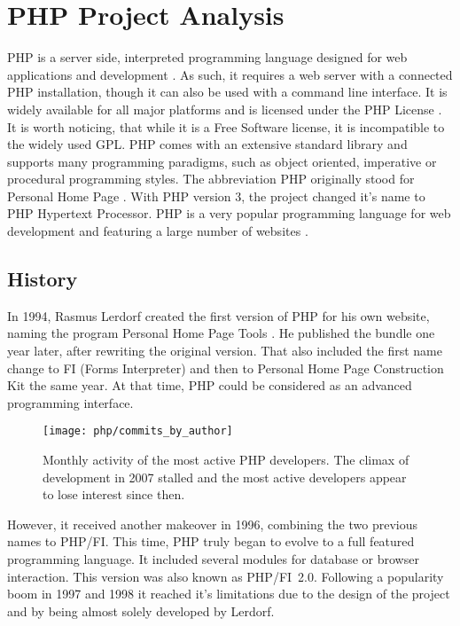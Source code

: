 \section{PHP Project Analysis} %


PHP is a server side, interpreted programming language designed for web
applications and development \cite{PHPIntro}. As such, it requires a web server
with a connected PHP installation, though it can also be used with a command
line interface. It is widely available for all major platforms and is licensed
under the PHP License \cite{PHPManual}. It is worth noticing, that while it is
a Free Software license, it is incompatible to the widely used \ac{GPL}. PHP
comes with an extensive standard library and supports many programming
paradigms, such as object oriented, imperative or procedural programming
styles. The abbreviation PHP originally stood for Personal Home Page
\cite{PHPHistory}. With PHP version 3, the project changed it's name to PHP
Hypertext Processor. PHP is a very popular programming language for web
development and featuring a large number of websites
\cite{PHPW3Techs,PHPStats}.

\subsection{History} %

In 1994, Rasmus Lerdorf created the first version of PHP for his own website,
naming the program Personal Home Page Tools \cite{PHPHistory}. He published the
bundle one year later, after rewriting the original version. That also included
the first name change to FI (Forms Interpreter) and then to Personal Home Page
Construction Kit the same year. At that time, PHP could be considered as an
advanced programming interface.

\begin{figure}[htbp]
  \centering
  \texttt{[image: php/commits\_by\_author]}
  \caption[Commits by most active authors, PHP]
  {Monthly activity of the most active PHP developers. The climax of
    development in 2007 stalled and the most active developers appear to lose
    interest since then.}
\end{figure}

However, it received another makeover in 1996, combining the two previous names
to PHP/FI. This time, PHP truly began to evolve to a full featured programming
language. It included several modules for database or browser interaction. This
version was also known as PHP/FI~2.0. Following a popularity boom in 1997 and
1998 it reached it's limitations due to the design of the project and by being
almost solely developed by Lerdorf.

